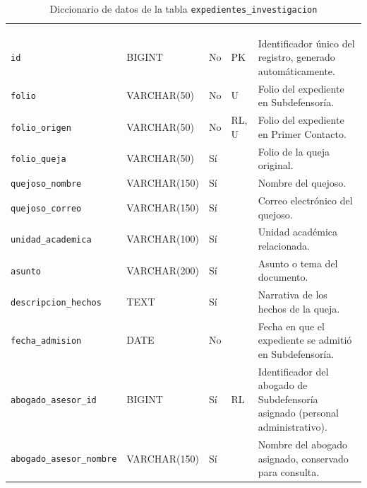 \footnotesize
\renewcommand{\arraystretch}{1.15}
\setlength{\tabcolsep}{4pt}
\begin{longtable}{|L{3.9cm}|L{2.4cm}|L{0.9cm}|L{1.2cm}|L{6.6cm}|}
	\hiderowcolors\caption{Diccionario de datos de la tabla \texttt{expedientes\_investigacion}}
	\label{tab:dic_expedientes_investigacion} \\ \showrowcolors
	\hline
	 &  &  &  &  \\
	\hline
	\endfirsthead
	\hline
	 &  &  &  &  \\
	\hline
	\endhead
		\texttt{id} & BIGINT & No & PK & Identificador único del registro, generado automáticamente. \\ \hline
		\texttt{folio} & VARCHAR(50) & No & U & Folio del expediente en Subdefensoría. \\ \hline
		\texttt{folio\_\allowbreak{}origen} & VARCHAR(50) & No & RL, U & Folio del expediente en Primer Contacto. \\ \hline
		\texttt{folio\_\allowbreak{}queja} & VARCHAR(50) & Sí &  & Folio de la queja original. \\ \hline
		\texttt{quejoso\_\allowbreak{}nombre} & VARCHAR(150) & Sí &  & Nombre del quejoso. \\ \hline
		\texttt{quejoso\_\allowbreak{}correo} & VARCHAR(150) & Sí &  & Correo electrónico del quejoso. \\ \hline
		\texttt{unidad\_\allowbreak{}academica} & VARCHAR(100) & Sí &  & Unidad académica relacionada. \\ \hline
		\texttt{asunto} & VARCHAR(200) & Sí &  & Asunto o tema del documento. \\ \hline
		\texttt{descripcion\_\allowbreak{}hechos} & TEXT & Sí &  & Narrativa de los hechos de la queja. \\ \hline
		\texttt{fecha\_\allowbreak{}admision} & DATE & No &  & Fecha en que el expediente se admitió en Subdefensoría. \\ \hline
		\texttt{abogado\_\allowbreak{}asesor\_\allowbreak{}id} & BIGINT & Sí & RL & Identificador del abogado de Subdefensoría asignado (personal administrativo). \\ \hline
		\texttt{abogado\_\allowbreak{}asesor\_\allowbreak{}nombre} & VARCHAR(150) & Sí &  & Nombre del abogado asignado, conservado para consulta. \\ \hline

\end{longtable}
